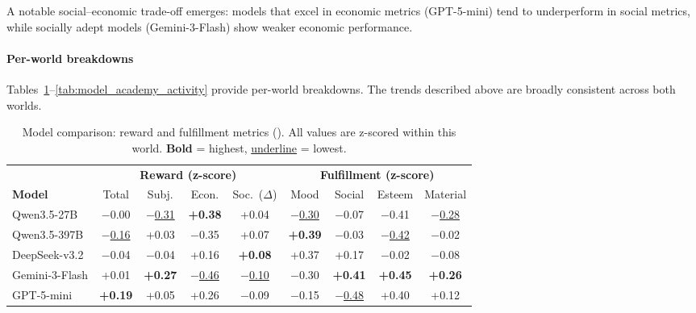 A notable social--economic trade-off emerges:
models that excel in economic metrics (GPT-5-mini)
tend to underperform in social metrics,
while socially adept models (Gemini-3-Flash)
show weaker economic performance.

\paragraph{Per-world breakdowns}
Tables~\ref{tab:model_campus_reward}--\ref{tab:model_academy_activity}
provide per-world breakdowns.
The trends described above are broadly consistent across both worlds.

\begin{table}[t]
\centering
\caption{Model comparison: reward and fulfillment metrics (\campus{}).
All values are z-scored within this world.
\textbf{Bold} = highest, \underline{underline} = lowest.}
\label{tab:model_campus_reward}
\begin{tabular}{l c c c c | c c c c}
\toprule
& \multicolumn{4}{c}{\textbf{Reward (z-score)}}
& \multicolumn{4}{c}{\textbf{Fulfillment (z-score)}} \\
\cmidrule(lr){2-5} \cmidrule(l){6-9}
\textbf{Model} & Total & Subj. & Econ. & Soc.~($\Delta$) & Mood & Social & Esteem & Material \\
\midrule
Qwen3.5-27B      & $-$0.00 & \underline{$-$0.31} & \textbf{+0.38} & +0.04 & \underline{$-$0.30} & $-$0.07 & $-$0.41 & \underline{$-$0.28} \\
Qwen3.5-397B     & \underline{$-$0.16} & +0.03 & $-$0.35 & +0.07 & \textbf{+0.39} & $-$0.03 & \underline{$-$0.42} & $-$0.02 \\
DeepSeek-v3.2    & $-$0.04 & $-$0.04 & +0.16 & \textbf{+0.08} & +0.37 & +0.17 & $-$0.02 & $-$0.08 \\
Gemini-3-Flash   & +0.01 & \textbf{+0.27} & \underline{$-$0.46} & \underline{$-$0.10} & $-$0.30 & \textbf{+0.41} & \textbf{+0.45} & \textbf{+0.26} \\
GPT-5-mini       & \textbf{+0.19} & +0.05 & +0.26 & $-$0.09 & $-$0.15 & \underline{$-$0.48} & +0.40 & +0.12 \\
\bottomrule
\end{tabular}
\end{table}

